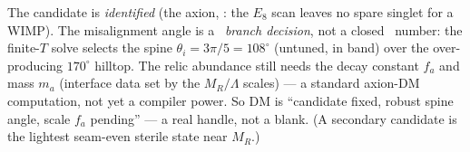 \begin{keybox}
The candidate is \emph{identified} (the axion, \mE: the $E_8$ scan leaves no spare singlet for a WIMP).
The misalignment angle is a \mC\ \emph{branch decision}, not a closed \mE\ number: the finite-$T$ solve
selects the spine $\theta_i=3\pi/5=108^\circ$ (untuned, in band) over the over-producing $170^\circ$
hilltop. The relic abundance still needs the decay constant $f_a$ and mass $m_a$ (interface data set by
the $M_R/\Lambda$ scales) --- a standard axion-DM computation, not yet a compiler power. So DM is
``candidate fixed, robust spine angle, scale $f_a$ pending'' --- a real handle, not a blank. (A secondary
candidate is the lightest seam-even sterile state near $M_R$.)
\end{keybox}

